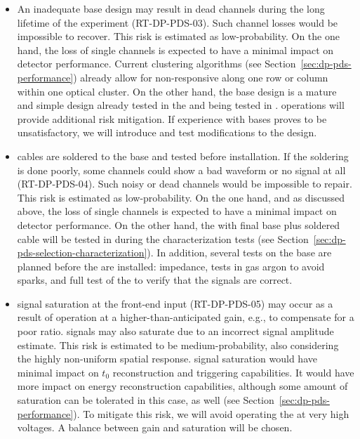 \begin{itemize}
\item An inadequate  base design may result in dead  channels during the long lifetime of the experiment (RT-DP-PDS-03). Such channel losses would be impossible to recover. %
This risk is estimated as low-probability. On the one hand, the loss of single  channels is expected to have a minimal impact on detector performance. Current  clustering algorithms (see Section~\ref{sec:dp-pds-performance}) already allow for non-responsive  along one row or column within one optical cluster. On the other hand, the  base design is a mature and simple design already tested in the  and being %
tested in .  operations will provide additional risk mitigation. If  experience with  bases proves to be unsatisfactory, we will introduce and test modifications to the design. %

\item {} cables are soldered to the  base and tested before installation. If the soldering is done poorly, some channels could show a bad waveform or no signal at all (RT-DP-PDS-04). Such noisy or dead channels would be impossible to repair. %
This risk is estimated as low-probability. On the one hand, and as discussed above, the loss of single  channels is expected to have a minimal impact on detector performance. On the other hand, the  with final base plus soldered cable will be tested in \lntwo during the  characterization tests (see Section~\ref{sec:dp-pds-selection-characterization}). In addition, several tests on the base are planned before the  are installed: impedance,  tests in gas argon to avoid sparks, and full test of the  to verify that the signals are correct.

\item {} signal saturation at the front-end input (RT-DP-PDS-05) may occur as a result of operation at a higher-than-anticipated  gain, e.g., to compensate for a poor  ratio.  signals may also saturate due to an incorrect signal amplitude estimate. This risk is estimated to be medium-probability, also considering the highly non-uniform  spatial response.  signal saturation would have minimal impact on  $t_0$ reconstruction and triggering capabilities. It would have more impact on  energy reconstruction capabilities, although some amount of saturation can be tolerated in this case, as well (see Section~\ref{sec:dp-pds-performance}). To mitigate this risk, we will avoid operating the  at very high voltages. A balance between gain and saturation will be chosen.


\end{itemize}
